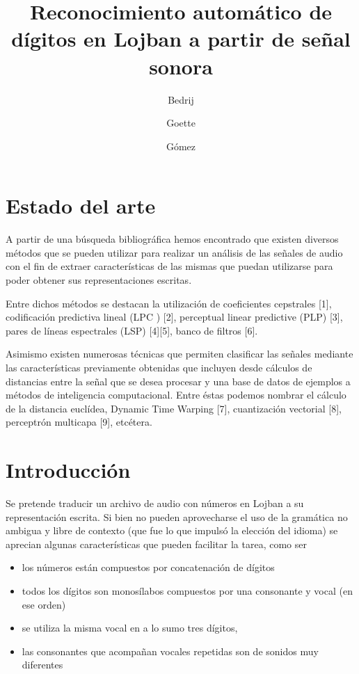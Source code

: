 \documentclass[a4paper]{article}
\title{Reconocimiento automático de dígitos en Lojban a partir de señal sonora}
\author{Bedrij \and Goette \and Gómez}
\date{}
\begin{document}
	\maketitle
	\section{Estado del arte}
		A partir de una búsqueda bibliográfica hemos encontrado que existen
		diversos métodos que se pueden utilizar para realizar un análisis de
		las señales de audio con el fin de extraer características de las mismas
		que puedan utilizarse para poder obtener sus representaciones escritas.

		Entre dichos métodos se destacan la utilización de coeficientes
		cepstrales [1], codificación predictiva lineal (LPC ) [2], perceptual
		linear predictive (PLP) [3], pares de líneas espectrales (LSP) [4][5],
		banco de filtros [6].


		Asimismo existen numerosas técnicas que permiten clasificar las señales
		mediante las características previamente obtenidas que incluyen desde
		cálculos de distancias entre la señal que se desea procesar y una base
		de datos de ejemplos a métodos de inteligencia computacional. Entre
		éstas podemos nombrar el cálculo de la distancia euclídea, Dynamic
		Time Warping [7],  cuantización vectorial [8], perceptrón multicapa
		[9], etcétera.

	\section{Introducción}
		Se pretende traducir un archivo de audio con números en Lojban
		a su representación escrita.
		Si bien no pueden aprovecharse el uso de la gramática
		no ambigua y libre de contexto (que fue lo que impulsó la
		elección del idioma) se aprecian algunas características que
		pueden facilitar la tarea, como ser
		\begin{itemize}\itemsep0pt
		\item los números están compuestos por concatenación de dígitos
		\item todos los dígitos son monosílabos compuestos por una consonante y vocal
			(en ese orden)
		\item se utiliza la misma vocal en a lo sumo tres dígitos,
		\item las consonantes que acompañan vocales repetidas son de sonidos muy diferentes
		\end{itemize}
\end{document}
